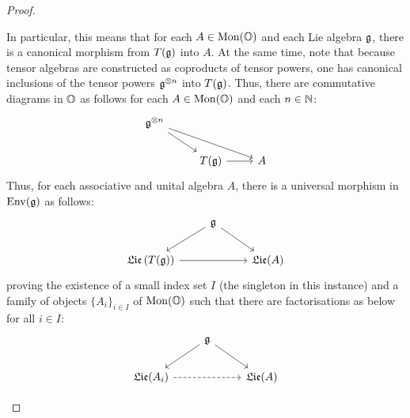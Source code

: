 \begin{proof}
\begin{enumerate}
                                In particular, this means that for each $A \in \Mon(\O)$ and each Lie algebra $\g$, there is a canonical morphism from $T(\g)$ into $A$. At the same time, note that because tensor algebras are constructed as coproducts of tensor powers, one has canonical inclusions of the tensor powers $\g^{\tensor n}$ into $T(\g)$. Thus, there are commutative diagrams in $\O$ as follows for each $A \in \Mon(\O)$ and each $n \in \N$:
                                    $$
                                        \begin{tikzcd}
                                        	{\g^{\tensor n}} \\
                                        	& {T(\g)} & {A}
                                        	\arrow[from=1-1, to=2-2]
                                        	\arrow[from=2-2, to=2-3]
                                        	\arrow[from=1-1, to=2-3]
                                        \end{tikzcd}
                                    $$
                                Thus, for each associative and unital algebra $A$, there is a universal morphism in $\Env(\g)$ as follows:
                                    $$
                                        \begin{tikzcd}
                                        	& {\g} \\
                                        	{\frakLie\left(T(\g)\right)} && {\frakLie(A)}
                                        	\arrow[from=2-1, to=2-3]
                                        	\arrow[from=1-2, to=2-1]
                                        	\arrow[from=1-2, to=2-3]
                                        \end{tikzcd}
                                    $$
                                proving the existence of a small index set $I$ (the singleton in this instance) and a family of objects $\{A_i\}_{i \in I}$ of $\Mon(\O)$ such that there are factorisations as below for all $i \in I$:
                                    $$
                                        \begin{tikzcd}
                                        	& {\g} \\
                                        	{\frakLie(A_i)} && {\frakLie(A)}
                                        	\arrow[from=2-1, to=2-3, dashed]
                                        	\arrow["{}"', from=1-2, to=2-1]
                                        	\arrow["{}", from=1-2, to=2-3]

\end{tikzcd}$$
\end{enumerate}
\end{proof}
